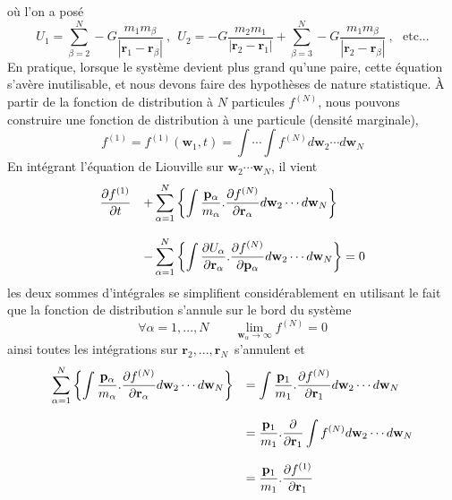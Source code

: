 o\`{u} l'on a pos\'{e}
\[
U_{1}=\displaystyle\sum\limits_{\beta=2}^{N}-G\dfrac{m_{1}m_{\beta}%
}{\left\vert \mathbf{r}_{1}-\mathbf{r}_{\beta}\right\vert }\ ,\ \ U_{2}%
=-G\dfrac{m_{2}m_{1}}{\left\vert \mathbf{r}_{2}-\mathbf{r}_{1}\right\vert
}+\displaystyle\sum\limits_{\beta=3}^{N}-G\dfrac{m_{1}m_{\beta}}{\left\vert
\mathbf{r}_{2}-\mathbf{r}_{\beta}\right\vert }\ ,\ \ \ \text{etc...}
\]
{En pratique, lorsque le syst\`{e}me devient plus grand qu'une paire, cette
\'{e}quation s'av\`{e}re inuti\-lisable, et nous devons faire des
hypoth\`{e}ses de nature statistique. \`{A} partir de la fonction de
distribution \`{a} $N$ particules $f^{(N)}$, nous pouvons construire une
fonction de distribution \`{a} une particule (densit\'{e} marginale),
\[
f^{(1)}=f^{(1)}(\mathbf{w}_{1},t)=\int\cdots\int f^{(N)}d\mathbf{w}_{2}\cdots
d\mathbf{w}_{N}
\]
En int\'{e}grant l'\'{e}quation de {Liouville} sur }$\mathbf{w}_{2}%
\cdots\mathbf{w}_{N}$, il vient
\[%
\begin{array}
[c]{ll}%
\dfrac{\partial f^{(1)}}{\partial t} & +\displaystyle\sum\limits_{\alpha
=1}^{N}\left\{  \displaystyle\int\dfrac{\mathbf{p}_{\alpha}}{m_{\alpha}%
}.\dfrac{\partial f^{(N)}}{\partial\mathbf{r}_{\alpha}}d\mathbf{w}_{2}\cdots
d\mathbf{w}_{N}\right\} \\
& \\
& -\displaystyle\sum\limits_{\alpha=1}^{N}\left\{  \displaystyle\int%
\dfrac{\partial U_{\alpha}}{\partial\mathbf{r}_{\alpha}}.\dfrac{\partial
f^{(N)}}{\partial\mathbf{p}_{\alpha}}d\mathbf{w}_{2}\cdots d\mathbf{w}%
_{N}\right\}  =0
\end{array}
\]
{les deux sommes d'int\'{e}grales se simplifient consid\'{e}rablement en
utilisant le fait que la fonction de distribution s'annule sur le bord du
syst\`{e}me}
\[
\forall\alpha=1,...,N\qquad\lim_{\mathbf{w}_{\alpha}\rightarrow\infty
}f^{\left(  N\right)  }=0
\]
{ainsi toutes les int\'{e}grations sur }$\mathbf{r}_{2},...,\mathbf{r}_{N}%
${\ s'annulent et }
\[%
\begin{array}
[c]{ll}%
\displaystyle\sum\limits_{\alpha=1}^{N}\left\{  \displaystyle\int%
\dfrac{\mathbf{p}_{\alpha}}{m_{\alpha}}.\dfrac{\partial f^{(N)}}%
{\partial\mathbf{r}_{\alpha}}d\mathbf{w}_{2}\cdots d\mathbf{w}_{N}\right\}  &
=\displaystyle\int\dfrac{\mathbf{p}_{1}}{m_{1}}.\dfrac{\partial f^{(N)}%
}{\partial\mathbf{r}_{1}}d\mathbf{w}_{2}\cdots d\mathbf{w}_{N}\\
& \\
& =\dfrac{\mathbf{p}_{1}}{m_{1}}.\dfrac{\partial}{\partial\mathbf{r}_{1}%
}\displaystyle\int f^{(N)}d\mathbf{w}_{2}\cdots d\mathbf{w}_{N}\\
& \\
& =\dfrac{\mathbf{p}_{1}}{m_{1}}.\dfrac{\partial f^{(1)}}{\partial
\mathbf{r}_{1}}%
\end{array}
\]


